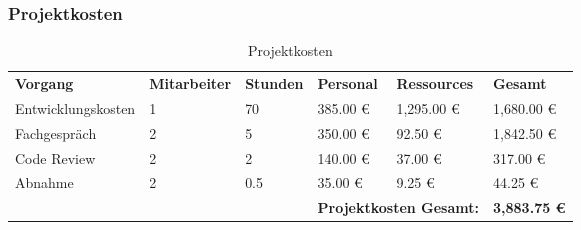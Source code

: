 \subsubsection{Projektkosten}
\begin{sidewaystable}
	\centering
	\caption{Projektkosten}
	\label{tabelle:projektkosten}
	\begin{tabular}{llllll}
		\rowcolor[HTML]{9698ED}
		{\color[HTML]{FFFFFF} \textbf{Vorgang}} & {\color[HTML]{FFFFFF} \textbf{Mitarbeiter}} & {\color[HTML]{FFFFFF} \textbf{Stunden}} & {\color[HTML]{FFFFFF} \textbf{Personal}} & {\color[HTML]{FFFFFF} \textbf{Ressources}} & {\color[HTML]{FFFFFF} \textbf{Gesamt}} \\
		Entwicklungskosten                      & 1                                           & 70                                      & 385.00 €                                 & 1,295.00 €                                 & 1,680.00 €                             \\
		\rowcolor[HTML]{BBDAFF}
		Fachgespräch                            & 2                                           & 5                                       & 350.00 €                                 & 92.50 €                                    & 1,842.50 €                             \\
		Code Review                             & 2                                           & 2                                       & 140.00 €                                 & 37.00 €                                    & 317.00 €                               \\
		\rowcolor[HTML]{BBDAFF}
		Abnahme                                 & 2                                           & 0.5                                     & 35.00 €                                  & 9.25 €                                     & 44.25 €                                \\
		&                                             &                                         & \multicolumn{2}{l}{\textbf{Projektkosten Gesamt:}}                                    & \textbf{3,883.75 €}
	\end{tabular}
\end{sidewaystable}

